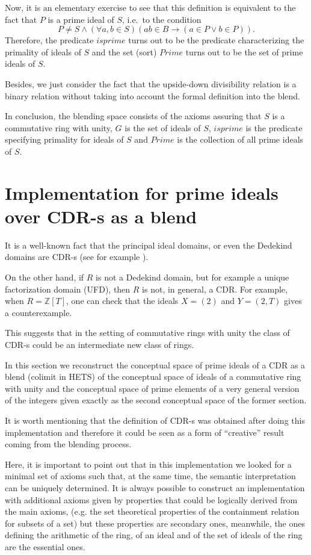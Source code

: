 Now, it is an elementary exercise to see that this definition is
equivalent to the fact that $P$ is a prime ideal of $S$, i.e.\ to the
condition
%
\[ P\neq S \wedge (\forall a,b\in S)(ab\in B\rightarrow (a\in P \vee
b\in P)).\] Therefore, the predicate $isprime$ turns out to be the
predicate characterizing the primality of ideals of $S$ and the set
(sort) $Prime$ turns out to be the set of prime ideals of $S$.

Besides, we just consider the fact that the upside-down divisibility
relation is a binary relation without taking into account the formal
definition into the blend.

In conclusion, the blending space consists of the axioms assuring that
$S$ is a commutative ring with unity, $G$ is the set of ideals of $S$,
$isprime$ is the predicate specifying primality for ideals of $S$ and
$Prime$ is the collection of all prime ideals of $S$.


\section{Implementation for prime ideals over CDR-s as a blend}\label{implementation}


It is a well-known fact that the principal ideal domains, or even the
Dedekind domains are CDR-s (see for example \cite[Fundamental Theorem
of AOK-s]{weissalgebraicnumber}).

On the other hand, if $R$ is not a Dedekind domain, but for example a
unique factorization domain (UFD), then $R$ is not, in general, a
CDR. For example, when $R=\mathbb{Z}[T]$, one can check that the
ideals $X=(2)$ and $Y=(2,T)$ gives a counterexample.

This suggests that in the setting of commutative rings with unity the
class of CDR-s could be an intermediate new class of rings.

In this section we reconstruct the conceptual space of prime ideals of
a CDR as a blend (colimit in HETS) of the conceptual space of ideals
of a commutative ring with unity and the conceptual space of prime
elements of a very general version of the integers given exactly as
the second conceptual space of the former section.

It is worth mentioning that the definition of CDR-s was obtained after
doing this implementation and therefore it could be seen as a form of
``creative'' result coming from the blending process.

Here, it is important to point out that in this implementation we
looked for a minimal set of axioms such that, at the same time, the
semantic interpretation can be uniquely determined. It is always
possible to construct an implementation with additional axioms given
by properties that could be logically derived from the main axioms,
(e.g. the set theoretical properties of the containment relation for
subsets of a set) but these properties are secondary ones, meanwhile,
the ones defining the arithmetic of the ring, of an ideal and of the
set of ideals of the ring are the essential ones.

